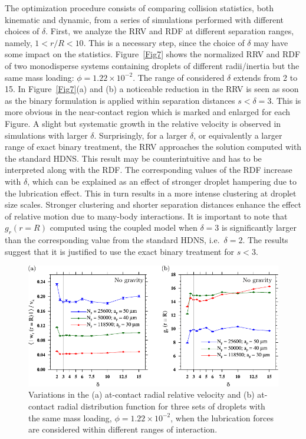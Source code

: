 \documentclass[../thesis.tex]{subfiles}
\begin{document}
The optimization procedure consists of comparing collision statistics, both kinematic and dynamic, from a series of simulations performed with different choices of $\delta$. First, we analyze the RRV and RDF at different separation ranges, namely, $1<r/R<10$. This is a necessary step, since the choice of $\delta$ may have some impact on the statistics. Figure~\ref{Fig7} shows the normalized RRV and RDF of two monodisperse systems containing droplets of different radii/inertia but the same mass loading: $\phi = 1.22\times10^{-2}$. The range of considered $\delta$ extends from 2 to 15. In Figure~\ref{Fig7}(a) and (b) a noticeable reduction in the RRV is seen as soon as the binary formulation is applied within separation distances $s<\delta=3$. This is more obvious in the near-contact region which is marked and enlarged for each Figure. A slight but systematic growth in the relative velocity is observed in simulations with larger $\delta$. Surprisingly, for a larger $\delta$, or equivalently a larger range of exact binary treatment, the RRV approaches the solution computed with the standard HDNS. This result may be counterintuitive and has to be interpreted along with the RDF. The corresponding values of the RDF increase with $\delta$, which can be explained as an effect of stronger droplet hampering due to the lubrication effect. This in turn results in a more intense clustering at droplet size scales. Stronger clustering and shorter separation distances enhance the effect of relative motion due to many-body interactions. It is important to note that $g_r(r=R)$ computed using the coupled model when $\delta = 3$ is significantly larger than the corresponding value from the standard HDNS, i.e.\ $\delta = 2$. The results suggest that it is justified to use the exact binary treatment for $s<3$.

\begin{figure}%
\center
\includegraphics[width=\textwidth]{../figs/JFM/fig8.pdf}
\caption{Variations in the (a) at-contact radial relative velocity and (b) at-contact radial distribution function for three sets of droplets with the same mass loading, $\phi = 1.22\times10^{-2}$, when the lubrication forces are considered within different ranges of interaction.}
\label{Fig8}
\end{figure}%
\end{document}
